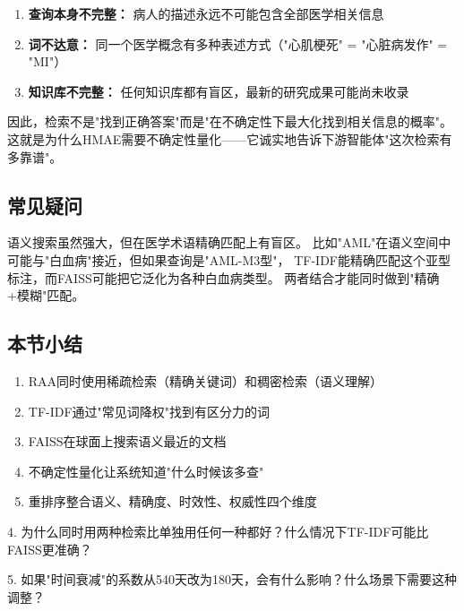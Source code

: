 \documentclass[11pt,a4paper]{ctexart}
\begin{document}
\begin{enumerate}[nosep]
\item \textbf{查询本身不完整：} 病人的描述永远不可能包含全部医学相关信息
\item \textbf{词不达意：} 同一个医学概念有多种表述方式（"心肌梗死" = "心脏病发作" = "MI"）
\item \textbf{知识库不完整：} 任何知识库都有盲区，最新的研究成果可能尚未收录
\end{enumerate}

因此，检索不是"找到正确答案"而是"在不确定性下最大化找到相关信息的概率"。
这就是为什么HMAE需要不确定性量化——它诚实地告诉下游智能体"这次检索有多靠谱"。

\subsection{常见疑问}

\begin{warnbox}
语义搜索虽然强大，但在医学术语精确匹配上有盲区。
比如"AML"在语义空间中可能与"白血病"接近，但如果查询是"AML-M3型"，
TF-IDF能精确匹配这个亚型标注，而FAISS可能把它泛化为各种白血病类型。
两者结合才能同时做到"精确+模糊"匹配。
\end{warnbox}

\subsection{本节小结}

\begin{enumerate}[nosep]
\item RAA同时使用稀疏检索（精确关键词）和稠密检索（语义理解）
\item TF-IDF通过"常见词降权"找到有区分力的词
\item FAISS在球面上搜索语义最近的文档
\item 不确定性量化让系统知道"什么时候该多查"
\item 重排序整合语义、精确度、时效性、权威性四个维度
\end{enumerate}

\begin{exerbox}[思考题]
4. 为什么同时用两种检索比单独用任何一种都好？什么情况下TF-IDF可能比FAISS更准确？

5. 如果"时间衰减"的系数从540天改为180天，会有什么影响？什么场景下需要这种调整？
\end{exerbox}

\newpage

\end{document}
